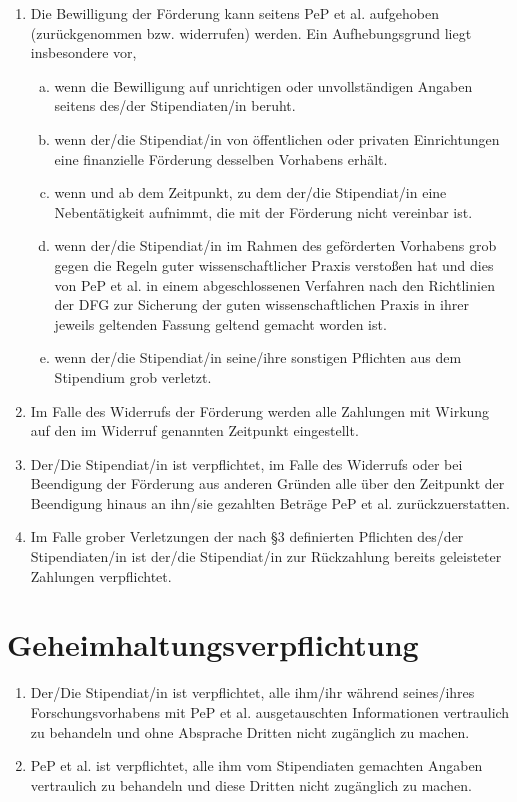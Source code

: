 \documentclass[
  paper=a4,
  fontsize=12pt,
  DIV=16,
  parskip=full,
  headinclude=true,
]{scrartcl}
\begin{document}
\begin{enumerate}[\qquad(1)]
	\item Die Bewilligung der Förderung kann seitens PeP et al. aufgehoben
		(zurückgenommen bzw. widerrufen) werden. Ein Aufhebungsgrund
		liegt insbesondere vor,
		\begin{enumerate}[(a)]
			\item wenn die Bewilligung auf unrichtigen oder
				unvollständigen Angaben seitens des/der
				Stipendiaten/in beruht.
			\item wenn der/die Stipendiat/in von öffentlichen oder
				privaten Einrichtungen eine finanzielle Förderung
				desselben Vorhabens erhält.
			\item wenn und ab dem Zeitpunkt, zu dem der/die Stipendiat/in
				eine Nebentätigkeit aufnimmt, die mit der Förderung
				nicht vereinbar ist.
			\item wenn der/die Stipendiat/in im Rahmen des geförderten
				Vorhabens grob gegen die Regeln guter wissenschaftlicher
				Praxis verstoßen hat und dies von PeP et al. in einem
				abgeschlossenen Verfahren nach den Richtlinien
				der DFG zur Sicherung der guten wissenschaftlichen
				Praxis in ihrer jeweils geltenden Fassung geltend
				gemacht worden ist.
			\item wenn der/die Stipendiat/in seine/ihre sonstigen Pflichten
				aus dem Stipendium grob verletzt.
		\end{enumerate}
	\item Im Falle des Widerrufs der Förderung werden alle Zahlungen mit Wirkung
		auf den im Widerruf genannten Zeitpunkt eingestellt.
	\item Der/Die Stipendiat/in ist verpflichtet, im Falle des Widerrufs oder
		bei Beendigung der Förderung aus anderen Gründen alle über den
		Zeitpunkt der Beendigung hinaus an ihn/sie gezahlten Beträge
		PeP et al. zurückzuerstatten.
	\item Im Falle grober Verletzungen der nach §3 definierten Pflichten
		des/der Stipendiaten/in ist der/die Stipendiat/in zur Rückzahlung
		bereits geleisteter Zahlungen verpflichtet.
\end{enumerate}

\section{Geheimhaltungsverpflichtung}

\begin{enumerate}[\qquad(1)]
	\item Der/Die Stipendiat/in ist verpflichtet, alle ihm/ihr während
		seines/ihres Forschungsvorhabens mit PeP et al. ausgetauschten
		Informationen vertraulich zu behandeln und ohne Absprache
		Dritten nicht zugänglich zu machen.
	\item PeP et al. ist verpflichtet, alle ihm vom Stipendiaten gemachten
		Angaben vertraulich zu behandeln und diese Dritten nicht
		zugänglich zu machen.
\end{enumerate}
\end{document}
